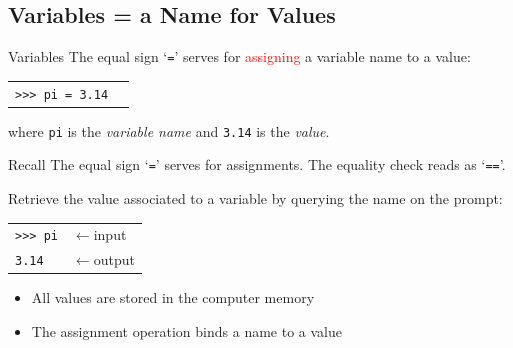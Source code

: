 \documentclass[t,handout,9pt]{beamer}
\begin{document}
\subsection{Variables = a Name for Values}
\begin{frame}{Variables}
The equal sign `\texttt{=}' serves for \textcolor{red}{assigning} a variable name to a value:
\begin{table}[]
\begin{tabular}{ll}
\texttt{>{}>{}> pi = 3.14} & \\
\end{tabular}
\end{table}
where \texttt{pi} is the \textit{variable name} and \texttt{3.14} is the \textit{value}.
\begin{block}{Recall}
The equal sign `\texttt{=}' serves for assignments. The equality check reads as `\texttt{==}'.
\end{block}
Retrieve the value associated to a variable by querying the name on the prompt:
\begin{table}[]
\begin{tabular}{ll}
\texttt{>{}>{}> pi} & $\leftarrow$input  \\
\texttt{3.14}        & $\leftarrow$output
\end{tabular}
\end{table}
\begin{itemize}
	\item All values are stored in the computer memory
	\item The assignment operation binds a name to a value
\end{itemize}
\end{frame}
%
\end{document}

